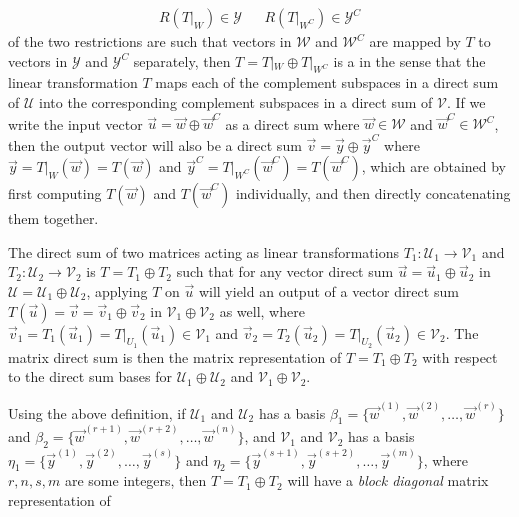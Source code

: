 \begin{align*}
R(T|_W) \in \mathcal{Y} & & R(T|_{W^C}) \in \mathcal{Y}^C
\end{align*}
of the two restrictions are such that vectors in $\mathcal{W}$ and $\mathcal{W}^C$ are mapped by $T$ to vectors in $\mathcal{Y}$ and $\mathcal{Y}^C$ separately, then $T = T|_W \oplus T|_{W^C}$ is a  in the sense that the linear transformation $T$ maps each of the complement subspaces in a direct sum of $\mathcal{U}$ into the corresponding complement subspaces in a direct sum of $\mathcal{V}$. If we write the input vector $\vec{u} = \vec{w} \oplus \vec{w}^C$ as a direct sum where $\vec{w} \in \mathcal{W}$ and $\vec{w}^C \in \mathcal{W}^C$, then the output vector will also be a direct sum $\vec{v} = \vec{y} \oplus \vec{y}^C$ where $\vec{y} = T|_W(\vec{w}) = T(\vec{w})$ and $\vec{y}^C = T|_{W^C}(\vec{w}^C) = T(\vec{w}^C)$, which are obtained by first computing $T(\vec{w})$ and $T(\vec{w}^C)$ individually, and then directly concatenating them together.
\begin{defn}
\label{defn:matdirectsum}
The direct sum of two matrices acting as linear transformations $T_1: \mathcal{U}_1 \to \mathcal{V}_1$ and $T_2: \mathcal{U}_2 \to \mathcal{V}_2$ is $T = T_1 \oplus T_2$ such that for any vector direct sum $\vec{u} = \vec{u}_1 \oplus \vec{u}_2$ in $\mathcal{U} = \mathcal{U}_1 \oplus \mathcal{U}_2$, applying $T$ on $\vec{u}$ will yield an output of a vector direct sum $T(\vec{u}) = \vec{v} = \vec{v}_1 \oplus \vec{v}_2$ in $\mathcal{V}_1 \oplus \mathcal{V}_2$ as well, where $\vec{v}_1 = T_1(\vec{u}_1) = T|_{U_1}(\vec{u}_1) \in \mathcal{V}_1$ and $\vec{v}_2 = T_2(\vec{u}_2) = T|_{U_2}(\vec{u}_2) \in \mathcal{V}_2$. The matrix direct sum is then the matrix representation of $T = T_1 \oplus T_2$ with respect to the direct sum bases for $\mathcal{U}_1 \oplus \mathcal{U}_2$ and $\mathcal{V}_1 \oplus \mathcal{V}_2$.
\end{defn}
Using the above definition, if $\mathcal{U}_1$ and $\mathcal{U}_2$ has a basis $\mathcal{\beta}_1 = \{\vec{w}^{(1)}, \vec{w}^{(2)}, \ldots, \vec{w}^{(r)}\}$ and $\mathcal{\beta}_2 = \{\vec{w}^{(r+1)}, \vec{w}^{(r+2)}, \ldots, \vec{w}^{(n)}\}$, and $\mathcal{V}_1$ and $\mathcal{V}_2$ has a basis $\mathcal{\eta}_1 = \{\vec{y}^{(1)}, \vec{y}^{(2)}, \allowbreak \ldots, \vec{y}^{(s)}\}$ and $\mathcal{\eta}_2 = \{\vec{y}^{(s+1)}, \vec{y}^{(s+2)}, \ldots, \vec{y}^{(m)}\}$, where $r, n, s, m$ are some integers, then $T = T_1 \oplus T_2$ will have a \textit{block diagonal} matrix representation of
